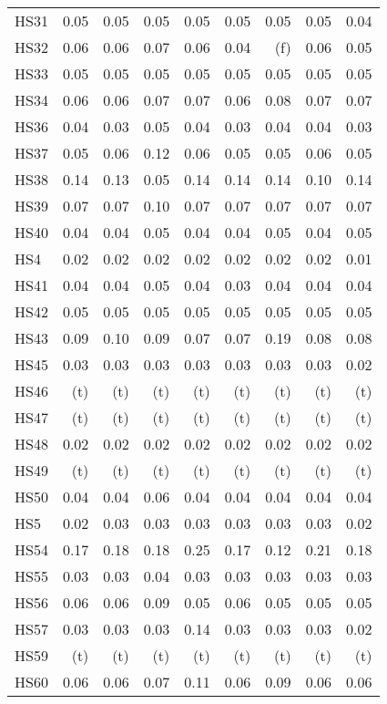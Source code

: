 \documentclass[11pt,twoside]{article}
\begin{document}
{\begin{longtable}[c]{|l|r|r|r|r|r|r|r|r|}
HS31 & 0.05 & 0.05 & 0.05 & 0.05 & 0.05 & 0.05 & 0.05 & 0.04 \\
HS32 & 0.06 & 0.06 & 0.07 & 0.06 & 0.04 & (f) & 0.06 & 0.05 \\
HS33 & 0.05 & 0.05 & 0.05 & 0.05 & 0.05 & 0.05 & 0.05 & 0.05 \\
HS34 & 0.06 & 0.06 & 0.07 & 0.07 & 0.06 & 0.08 & 0.07 & 0.07 \\
HS36 & 0.04 & 0.03 & 0.05 & 0.04 & 0.03 & 0.04 & 0.04 & 0.03 \\
HS37 & 0.05 & 0.06 & 0.12 & 0.06 & 0.05 & 0.05 & 0.06 & 0.05 \\
HS38 & 0.14 & 0.13 & 0.05 & 0.14 & 0.14 & 0.14 & 0.10 & 0.14 \\
HS39 & 0.07 & 0.07 & 0.10 & 0.07 & 0.07 & 0.07 & 0.07 & 0.07 \\
HS40 & 0.04 & 0.04 & 0.05 & 0.04 & 0.04 & 0.05 & 0.04 & 0.05 \\
HS4 & 0.02 & 0.02 & 0.02 & 0.02 & 0.02 & 0.02 & 0.02 & 0.01 \\
HS41 & 0.04 & 0.04 & 0.05 & 0.04 & 0.03 & 0.04 & 0.04 & 0.04 \\
HS42 & 0.05 & 0.05 & 0.05 & 0.05 & 0.05 & 0.05 & 0.05 & 0.05 \\
HS43 & 0.09 & 0.10 & 0.09 & 0.07 & 0.07 & 0.19 & 0.08 & 0.08 \\
HS45 & 0.03 & 0.03 & 0.03 & 0.03 & 0.03 & 0.03 & 0.03 & 0.02 \\
HS46 & (t) & (t) & (t) & (t) & (t) & (t) & (t) & (t) \\
HS47 & (t) & (t) & (t) & (t) & (t) & (t) & (t) & (t) \\
HS48 & 0.02 & 0.02 & 0.02 & 0.02 & 0.02 & 0.02 & 0.02 & 0.02 \\
HS49 & (t) & (t) & (t) & (t) & (t) & (t) & (t) & (t) \\
HS50 & 0.04 & 0.04 & 0.06 & 0.04 & 0.04 & 0.04 & 0.04 & 0.04 \\
HS5 & 0.02 & 0.03 & 0.03 & 0.03 & 0.03 & 0.03 & 0.03 & 0.02 \\
HS54 & 0.17 & 0.18 & 0.18 & 0.25 & 0.17 & 0.12 & 0.21 & 0.18 \\
HS55 & 0.03 & 0.03 & 0.04 & 0.03 & 0.03 & 0.03 & 0.03 & 0.03 \\
HS56 & 0.06 & 0.06 & 0.09 & 0.05 & 0.06 & 0.05 & 0.05 & 0.05 \\
HS57 & 0.03 & 0.03 & 0.03 & 0.14 & 0.03 & 0.03 & 0.03 & 0.02 \\
HS59 & (t) & (t) & (t) & (t) & (t) & (t) & (t) & (t) \\
HS60 & 0.06 & 0.06 & 0.07 & 0.11 & 0.06 & 0.09 & 0.06 & 0.06 \\

\end{longtable}}
\end{document}
